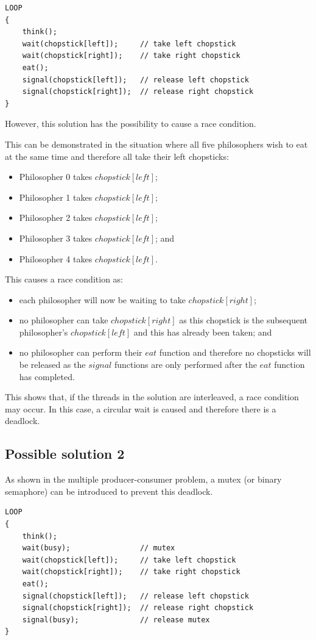 \documentclass[a4paper]{systems-software}
\begin{document}
\begin{lstlisting}[title={Philosopher class.}]
LOOP
{
	think();
	wait(chopstick[left]);     // take left chopstick
	wait(chopstick[right]);    // take right chopstick
	eat();
	signal(chopstick[left]);   // release left chopstick
	signal(chopstick[right]);  // release right chopstick
}
\end{lstlisting}

However, this solution has the possibility to cause a race condition.

This can be demonstrated in the situation where all five philosophers wish to eat at the same time and therefore all take their left chopsticks:
\begin{itemize}
	\item Philosopher 0 takes $chopstick[left]$;
	\item Philosopher 1 takes $chopstick[left]$;
	\item Philosopher 2 takes $chopstick[left]$;
	\item Philosopher 3 takes $chopstick[left]$; and
	\item Philosopher 4 takes $chopstick[left]$.
\end{itemize}

This causes a race condition as:
\begin{itemize}
	\item each philosopher will now be waiting to take $chopstick[right]$;
	\item no philosopher can take $chopstick[right]$ as this chopstick is the subsequent philosopher’s $chopstick[left]$ and this has already been taken; and
	\item no philosopher can perform their $eat$ function and therefore no chopsticks will be released as the $signal$ functions are only performed after the $eat$ function has completed.
\end{itemize}

This shows that, if the threads in the solution are interleaved, a race condition may occur. In this case, a circular wait is caused and therefore there is a deadlock.


\subsection*{Possible solution 2}

As shown in the multiple producer-consumer problem, a mutex (or binary semaphore) can be introduced to prevent this deadlock.

\begin{lstlisting}[title={Philosopher class.}]
LOOP
{
	think();
	wait(busy);                // mutex
	wait(chopstick[left]);     // take left chopstick
	wait(chopstick[right]);    // take right chopstick
	eat();
	signal(chopstick[left]);   // release left chopstick
	signal(chopstick[right]);  // release right chopstick
	signal(busy);              // release mutex
}
\end{lstlisting}
\end{document}
